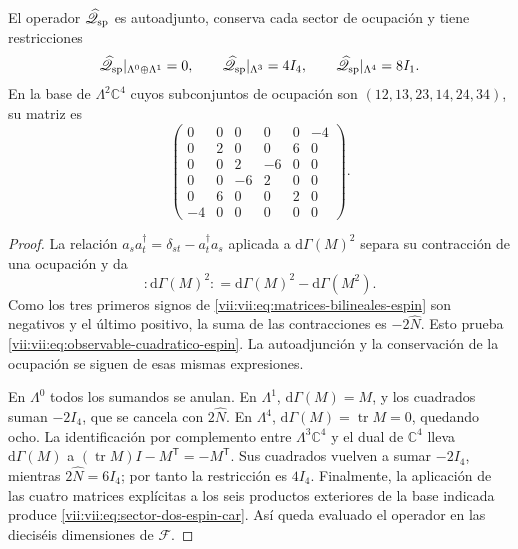 \begin{proposition}
\label{vii:vii:prop:operador-espin-car}
El operador \(\widehat{\mathscr Q}_{\rm sp}\) es autoadjunto,
conserva cada sector de ocupación y tiene restricciones
\begin{equation}
 \widehat{\mathscr Q}_{\rm sp}|_{\Lambda^0\oplus\Lambda^1}=0,
 \qquad
 \widehat{\mathscr Q}_{\rm sp}|_{\Lambda^3}=4I_4,
 \qquad
 \widehat{\mathscr Q}_{\rm sp}|_{\Lambda^4}=8I_1.
 \label{vii:vii:eq:sectores-espin-car}
\end{equation}
En la base de \(\Lambda^2\mathbb C^4\) cuyos subconjuntos de
ocupación son \((12,13,23,14,24,34)\), su matriz es
\begin{equation}
 \begin{pmatrix}
 0&0&0&0&0&-4\\
 0&2&0&0&6&0\\
 0&0&2&-6&0&0\\
 0&0&-6&2&0&0\\
 0&6&0&0&2&0\\
 -4&0&0&0&0&0
 \end{pmatrix}.
 \label{vii:vii:eq:sector-dos-espin-car}
\end{equation}
\end{proposition}
\begin{proof}
La relación \(a_s a_t^\dagger=\delta_{st}-a_t^\dagger a_s\)
aplicada a \(\mathrm d\Gamma(M)^2\) separa su contracción de
una ocupación y da
\[
 :\!\mathrm d\Gamma(M)^2\!:
 =\mathrm d\Gamma(M)^2-\mathrm d\Gamma(M^2).
\]
Como los tres primeros signos de
\eqref{vii:vii:eq:matrices-bilineales-espin} son negativos y el último
positivo, la suma de las contracciones es \(-2\widehat N\).
Esto prueba \eqref{vii:vii:eq:observable-cuadratico-espin}.
La autoadjunción y la conservación de la ocupación se siguen de
esas mismas expresiones.

En \(\Lambda^0\) todos los sumandos se anulan. En \(\Lambda^1\),
\(\mathrm d\Gamma(M)=M\), y los cuadrados suman \(-2I_4\),
que se cancela con \(2\widehat N\). En \(\Lambda^4\),
\(\mathrm d\Gamma(M)=\operatorname{tr}M=0\), quedando ocho.
La identificación por complemento entre \(\Lambda^3\mathbb C^4\)
y el dual de \(\mathbb C^4\) lleva
\(\mathrm d\Gamma(M)\) a
\((\operatorname{tr}M)I-M^{\mathsf T}=-M^{\mathsf T}\).
Sus cuadrados vuelven a sumar \(-2I_4\), mientras
\(2\widehat N=6I_4\); por tanto la restricción es \(4I_4\).
Finalmente, la aplicación de las cuatro matrices explícitas a los
seis productos exteriores de la base indicada produce
\eqref{vii:vii:eq:sector-dos-espin-car}. Así queda evaluado el operador
en las dieciséis dimensiones de \(\mathcal F\).
\end{proof}


